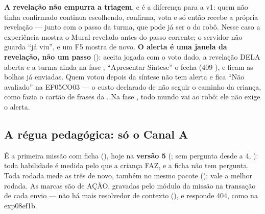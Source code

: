\textbf{A revelação não empurra a triagem}, e é a diferença para a v1: quem não
tinha confirmado continua escolhendo, confirma, vota e só então recebe a
própria revelação --- junto com o passo da turma, que pode já ser o do
robô. Nesse caso a experiência mostra o Mural revelado antes do passo
corrente; o servidor não guarda \enquote{já viu}, e um F5 mostra de novo.
\textbf{O alerta é uma janela da revelação, não um passo}
(): aceita jogada com o voto dado, a revelação DELA aberta e a
turma ainda na fase ; \enquote{Apresentar Síntese} o fecha (409
), e ficam as bolhas já enviadas. Quem votou depois da
síntese não tem alerta e fica \enquote{Não avaliado} na EF05CO03 --- o custo
declarado de não seguir o caminho da criança, como fazia o cartão de frases
da . Na fase , todo mundo vai ao robô: ele não
exige o alerta.

\subsection{A régua pedagógica: só o Canal A}

É a primeira missão com ficha (), hoje na
\textbf{versão 5} (; sem pergunta desde a 4, ): toda habilidade é medida pelo que a
criança FAZ, e a ficha não tem pergunta. Toda rodada mede as três de novo,
também no mesmo pacote (); vale a melhor rodada. As marcas são
de AÇÃO, gravadas pelo módulo da missão na transação de cada envio --- não há
mais resolvedor de contexto (), e
 responde 404, como na exp08ef1b.

